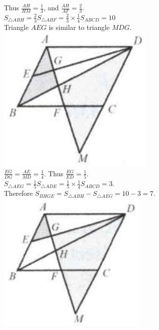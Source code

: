 \documentclass{article}
\begin{document}
Thus \(\frac{A H}{H M}=\frac{1}{3}\), and \(\frac{A H}{A F}=\frac{2}{3}\).\\
\(S_{\triangle A B H}=\frac{2}{3} S_{\triangle A B F}=\frac{2}{3} \times \frac{1}{4} S_{A B C D}=10\)\\
Triangle \(A E G\) is similar to triangle \(M D G\).\\
\centering
\includegraphics[width=\textwidth]{images/141.jpg}\\
\(\frac{E G}{D G}=\frac{A E}{M D}=\frac{1}{4}\). Thus \(\frac{E G}{E D}=\frac{1}{5}\).\\
\(S_{\triangle A E G}=\frac{1}{5} S_{\triangle A D E}=\frac{1}{5} \times \frac{1}{4} S_{A B C D}=3\).\\
Therefore \(S_{B H G E}=S_{\triangle A B H}-S_{\triangle A E G}=10-3=7\).\\
\centering
\includegraphics[width=\textwidth]{images/141(1).jpg}
\end{document}
